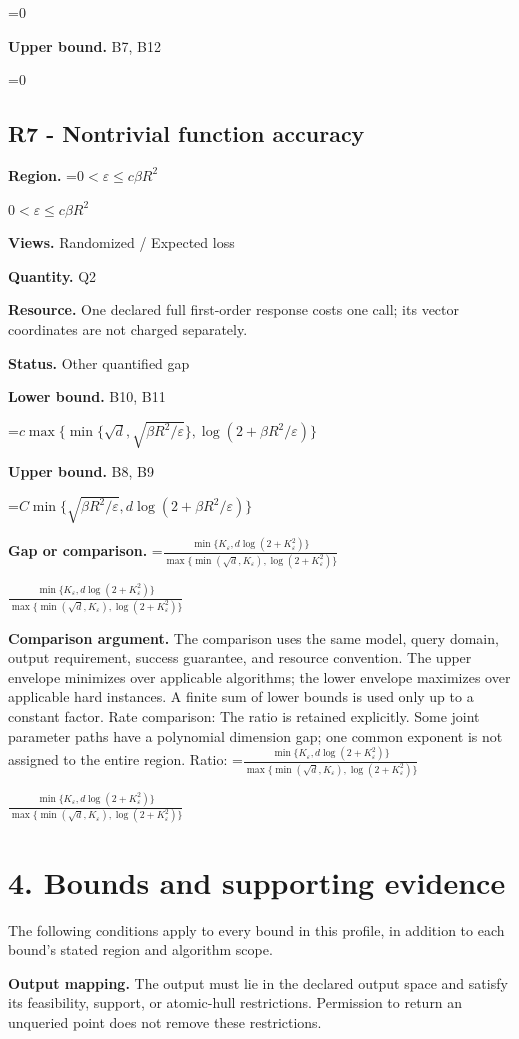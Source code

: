 \documentclass[10pt,a4paper]{article}
\newcommand{\AtlasMath}[1]{\par\begingroup\centering\setbox0=\hbox{$\displaystyle #1$}\ifdim\wd0>1.4\linewidth\typeout{ATLAS WIDE FORMULA: \the\wd0}\fi\ifdim\wd0>\linewidth\resizebox{\linewidth}{!}{\box0}\else\box0\fi\par\endgroup}
\newcommand{\AtlasInlineMath}[1]{\begingroup\setbox0=\hbox{$#1$}\ifdim\wd0>.4\linewidth\endgroup\AtlasMath{#1}\else\endgroup$#1$\fi}
\begin{document}
\AtlasMath{0}
\textbf{Upper bound.} B7, B12

\AtlasMath{0}
\subsection{R7 - Nontrivial function accuracy}
\textbf{Region.} \AtlasInlineMath{0<\varepsilon\le c\beta R^2}

\textbf{Views.} Randomized / Expected loss

\textbf{Quantity.} Q2

\textbf{Resource.} One declared full first-order response costs one call; its vector coordinates are not charged separately.

\textbf{Status.} Other quantified gap

\textbf{Lower bound.} B10, B11

\AtlasMath{c\max\{\min\{\sqrt d,\sqrt{\beta R^2/\varepsilon}\},\log(2+\beta R^2/\varepsilon)\}}
\textbf{Upper bound.} B8, B9

\AtlasMath{C\min\{\sqrt{\beta R^2/\varepsilon},d\log(2+\beta R^2/\varepsilon)\}}
\textbf{Gap or comparison.} \AtlasInlineMath{\frac{\min\{K_\varepsilon,d\log(2+K_\varepsilon^2)\}}{\max\{\min(\sqrt d,K_\varepsilon),\log(2+K_\varepsilon^2)\}}}

\textbf{Comparison argument.} The comparison uses the same model, query domain, output requirement, success guarantee, and resource convention. The upper envelope minimizes over applicable algorithms; the lower envelope maximizes over applicable hard instances. A finite sum of lower bounds is used only up to a constant factor. Rate comparison: The ratio is retained explicitly. Some joint parameter paths have a polynomial dimension gap; one common exponent is not assigned to the entire region. Ratio: \AtlasInlineMath{\frac{\min\{K_\varepsilon,d\log(2+K_\varepsilon^2)\}}{\max\{\min(\sqrt d,K_\varepsilon),\log(2+K_\varepsilon^2)\}}}

\section{4. Bounds and supporting evidence}
The following conditions apply to every bound in this profile, in addition to each bound's stated region and algorithm scope.

\textbf{Output mapping.} The output must lie in the declared output space and satisfy its feasibility, support, or atomic-hull restrictions. Permission to return an unqueried point does not remove these restrictions.
\end{document}
